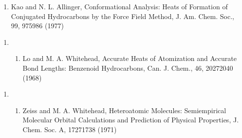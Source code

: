 \documentclass[letterpaper,11pt,english]{sphinxmanual}
\begin{document}
\begin{enumerate}
%
\setcounter{enumi}{9}
\item {} 
Kao and N. L. Allinger, Conformational Analysis: Heats of Formation of Conjugated Hydrocarbons by the Force Field Method, J. Am. Chem. Soc., 99, 975\sphinxhyphen{}986 (1977)

\end{enumerate}
\begin{enumerate}
%
\setcounter{enumi}{3}
\item {} \begin{enumerate}
%
\setcounter{enumii}{7}
\item {} 
Lo and M. A. Whitehead, Accurate Heats of Atomization and Accurate Bond Lengths: Benzenoid Hydrocarbons, Can. J. Chem., 46, 2027\sphinxhyphen{}2040 (1968)

\end{enumerate}

\end{enumerate}
\begin{enumerate}
%
\setcounter{enumi}{6}
\item {} \begin{enumerate}
%
\setcounter{enumii}{3}
\item {} 
Zeiss and M. A. Whitehead, Hetero\sphinxhyphen{}atomic Molecules: Semi\sphinxhyphen{}empirical Molecular Orbital Calculations and Prediction of Physical Properties, J. Chem. Soc. A, 1727\sphinxhyphen{}1738 (1971)

\end{enumerate}

\end{enumerate}
\end{document}
